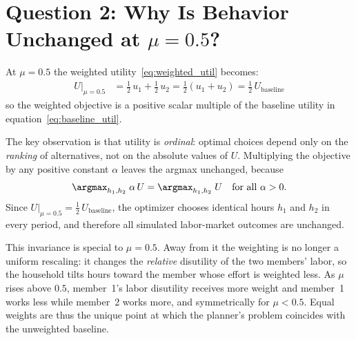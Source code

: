 \section{Question 2: Why Is Behavior Unchanged at $\mu = 0.5$?}

At $\mu = 0.5$ the weighted utility~\eqref{eq:weighted_util} becomes:
%
\begin{align}\label{eq:mu_half}
    U\big|_{\mu=0.5}
      &= \tfrac{1}{2}\,u_1 + \tfrac{1}{2}\,u_2
       = \tfrac{1}{2}(u_1 + u_2)
       = \tfrac{1}{2}\,U_{\text{baseline}}
\end{align}
%
so the weighted objective is a positive scalar multiple of the baseline utility in equation~\eqref{eq:baseline_util}.

The key observation is that utility is \emph{ordinal}: optimal choices depend only on the \emph{ranking} of alternatives, not on the absolute values of $U$. Multiplying the objective by any positive constant $\alpha$ leaves the argmax unchanged, because
\[
    \argmax_{h_1,h_2}\; \alpha\, U = \argmax_{h_1,h_2}\; U \quad \text{for all } \alpha > 0.
\]
Since $U|_{\mu=0.5} = \tfrac{1}{2}\,U_{\text{baseline}}$, the optimizer chooses identical hours $h_1$ and $h_2$ in every period, and therefore all simulated labor-market outcomes are unchanged.

This invariance is special to $\mu = 0.5$. Away from it the weighting is no longer a uniform rescaling: it changes the \emph{relative} disutility of the two members' labor, so the household tilts hours toward the member whose effort is weighted less. As $\mu$ rises above $0.5$, member~1's labor disutility receives more weight and member~1 works less while member~2 works more, and symmetrically for $\mu < 0.5$. Equal weights are thus the unique point at which the planner's problem coincides with the unweighted baseline.